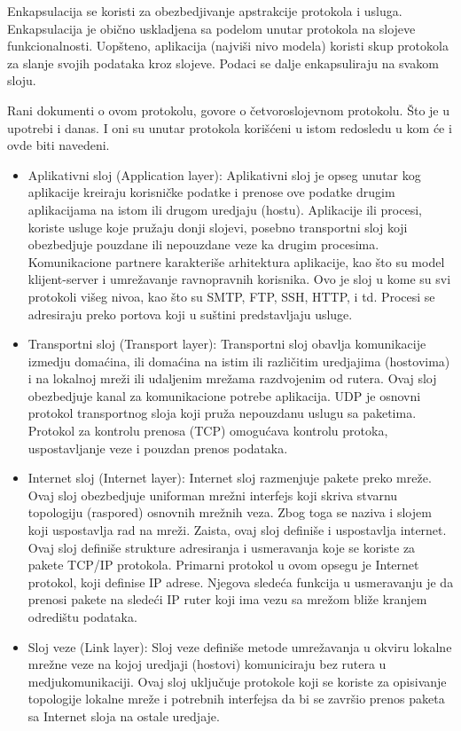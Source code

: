 \documentclass[a4paper,12pt, master]{etf}
\begin{document}
	Enkapsulacija se koristi za obezbedjivanje apstrakcije protokola i usluga. Enkapsulacija je 
	obi\v{c}no uskladjena sa podelom unutar protokola na slojeve funkcionalnosti. Uop\v{s}teno, 
	aplikacija (najvi\v{s}i nivo modela) koristi skup protokola za slanje svojih podataka kroz 
	slojeve. Podaci se dalje enkapsuliraju na svakom sloju.

	Rani dokumenti o ovom protokolu, govore o \v{c}etvoroslojevnom protokolu. \v{S}to je u upotrebi i 
	danas. I oni su unutar protokola kori\v{s}\'{c}eni u istom redosledu u kom \'{c}e i ovde biti navedeni.

	\begin{itemize}
		\item Aplikativni sloj (Application layer):
		Aplikativni sloj je opseg unutar kog aplikacije kreiraju korisni\v{c}ke podatke i prenose 
		ove podatke drugim aplikacijama na istom ili drugom uredjaju (hostu). Aplikacije ili 
		procesi, koriste usluge koje pru\v{z}aju donji slojevi, posebno transportni sloj koji 
		obezbedjuje pouzdane ili nepouzdane veze ka drugim procesima. Komunikacione partnere 
		karakteri\v{s}e arhitektura aplikacije, kao \v{s}to su model klijent-server i umre\v{z}avanje 
		ravnopravnih korisnika. Ovo je sloj u kome su svi protokoli vi\v{s}eg nivoa, kao \v{s}to su SMTP,
		 FTP, SSH, HTTP, i td. Procesi se adresiraju preko portova koji u su\v{s}tini predstavljaju 
		 usluge.
		\item Transportni sloj (Transport layer): 
		Transportni sloj obavlja komunikacije izmedju doma\'{c}ina, ili doma\'{c}ina na istim ili 
		razli\v{c}itim uredjajima (hostovima) i na lokalnoj mre\v{z}i ili udaljenim mre\v{z}ama razdvojenim 
		od rutera. Ovaj sloj obezbedjuje kanal za komunikacione potrebe aplikacija. UDP je 
		osnovni protokol transportnog sloja koji pru\v{z}a nepouzdanu uslugu sa paketima. Protokol 
		za kontrolu prenosa (TCP) omogu\'{c}ava kontrolu protoka, uspostavljanje veze i pouzdan 
		prenos podataka.
		\item Internet sloj (Internet layer): 
		Internet sloj razmenjuje pakete preko mre\v{z}e. Ovaj sloj obezbedjuje uniforman mre\v{z}ni 
		interfejs koji skriva stvarnu topologiju (raspored) osnovnih mre\v{z}nih veza. Zbog toga se 
		naziva i slojem koji uspostavlja rad na mre\v{z}i. Zaista, ovaj sloj defini\v{s}e i uspostavlja 
		internet. Ovaj sloj defini\v{s}e strukture adresiranja i usmeravanja koje se koriste za 
		pakete TCP/IP protokola. Primarni protokol u ovom opsegu je Internet protokol, koji 
		definise IP adrese. Njegova slede\'{c}a funkcija u usmeravanju je da prenosi pakete 
		na slede\'{c}i IP ruter koji ima vezu sa mre\v{z}om bli\v{z}e kranjem odredi\v{s}tu podataka.	
		\item Sloj veze (Link layer): 
		Sloj veze defini\v{s}e metode umre\v{z}avanja u okviru lokalne mre\v{z}ne veze na kojoj uredjaji 
		(hostovi) komuniciraju bez rutera u medjukomunikaciji. Ovaj sloj uklju\v{c}uje protokole 
		koji se koriste za opisivanje topologije lokalne mre\v{z}e i potrebnih interfejsa da bi se 
		zavr\v{s}io prenos paketa sa Internet sloja na ostale uredjaje.
	\end{itemize}
\end{document}
